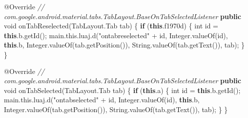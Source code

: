 \documentclass[
]{article}
\newenvironment{Shaded}{}{}
\newcommand{\AttributeTok}[1]{\textcolor[rgb]{0.49,0.56,0.16}{#1}}
\newcommand{\BuiltInTok}[1]{\textcolor[rgb]{0.00,0.50,0.00}{#1}}
\newcommand{\CommentTok}[1]{\textcolor[rgb]{0.38,0.63,0.69}{\textit{#1}}}
\newcommand{\ControlFlowTok}[1]{\textcolor[rgb]{0.00,0.44,0.13}{\textbf{#1}}}
\newcommand{\DataTypeTok}[1]{\textcolor[rgb]{0.56,0.13,0.00}{#1}}
\newcommand{\FunctionTok}[1]{\textcolor[rgb]{0.02,0.16,0.49}{#1}}
\newcommand{\KeywordTok}[1]{\textcolor[rgb]{0.00,0.44,0.13}{\textbf{#1}}}
\newcommand{\NormalTok}[1]{#1}
\newcommand{\OperatorTok}[1]{\textcolor[rgb]{0.40,0.40,0.40}{#1}}
\newcommand{\StringTok}[1]{\textcolor[rgb]{0.25,0.44,0.63}{#1}}
\begin{document}
\begin{Shaded}
\begin{Highlighting}[]
        \AttributeTok{@Override} \CommentTok{// com.google.android.material.tabs.TabLayout.BaseOnTabSelectedListener}
        \KeywordTok{public} \DataTypeTok{void} \FunctionTok{onTabReselected}\OperatorTok{(}\NormalTok{TabLayout}\OperatorTok{.}\FunctionTok{Tab}\NormalTok{ tab}\OperatorTok{)} \OperatorTok{\{}
            \ControlFlowTok{if} \OperatorTok{(}\KeywordTok{this}\OperatorTok{.}\FunctionTok{f1970d}\OperatorTok{)} \OperatorTok{\{}
                \DataTypeTok{int}\NormalTok{ id }\OperatorTok{=} \KeywordTok{this}\OperatorTok{.}\FunctionTok{b}\OperatorTok{.}\FunctionTok{getId}\OperatorTok{();}
\NormalTok{                main}\OperatorTok{.}\FunctionTok{this}\OperatorTok{.}\FunctionTok{luaj}\OperatorTok{.}\FunctionTok{d}\OperatorTok{(}\StringTok{"ontabreselected"} \OperatorTok{+}\NormalTok{ id}\OperatorTok{,} \BuiltInTok{Integer}\OperatorTok{.}\FunctionTok{valueOf}\OperatorTok{(}\NormalTok{id}\OperatorTok{),} \KeywordTok{this}\OperatorTok{.}\FunctionTok{b}\OperatorTok{,} \BuiltInTok{Integer}\OperatorTok{.}\FunctionTok{valueOf}\OperatorTok{(}\NormalTok{tab}\OperatorTok{.}\FunctionTok{getPosition}\OperatorTok{()),} \BuiltInTok{String}\OperatorTok{.}\FunctionTok{valueOf}\OperatorTok{(}\NormalTok{tab}\OperatorTok{.}\FunctionTok{getText}\OperatorTok{()),}\NormalTok{ tab}\OperatorTok{);}
            \OperatorTok{\}}
        \OperatorTok{\}}

        \AttributeTok{@Override} \CommentTok{// com.google.android.material.tabs.TabLayout.BaseOnTabSelectedListener}
        \KeywordTok{public} \DataTypeTok{void} \FunctionTok{onTabSelected}\OperatorTok{(}\NormalTok{TabLayout}\OperatorTok{.}\FunctionTok{Tab}\NormalTok{ tab}\OperatorTok{)} \OperatorTok{\{}
            \ControlFlowTok{if} \OperatorTok{(}\KeywordTok{this}\OperatorTok{.}\FunctionTok{a}\OperatorTok{)} \OperatorTok{\{}
                \DataTypeTok{int}\NormalTok{ id }\OperatorTok{=} \KeywordTok{this}\OperatorTok{.}\FunctionTok{b}\OperatorTok{.}\FunctionTok{getId}\OperatorTok{();}
\NormalTok{                main}\OperatorTok{.}\FunctionTok{this}\OperatorTok{.}\FunctionTok{luaj}\OperatorTok{.}\FunctionTok{d}\OperatorTok{(}\StringTok{"ontabselected"} \OperatorTok{+}\NormalTok{ id}\OperatorTok{,} \BuiltInTok{Integer}\OperatorTok{.}\FunctionTok{valueOf}\OperatorTok{(}\NormalTok{id}\OperatorTok{),} \KeywordTok{this}\OperatorTok{.}\FunctionTok{b}\OperatorTok{,} \BuiltInTok{Integer}\OperatorTok{.}\FunctionTok{valueOf}\OperatorTok{(}\NormalTok{tab}\OperatorTok{.}\FunctionTok{getPosition}\OperatorTok{()),} \BuiltInTok{String}\OperatorTok{.}\FunctionTok{valueOf}\OperatorTok{(}\NormalTok{tab}\OperatorTok{.}\FunctionTok{getText}\OperatorTok{()),}\NormalTok{ tab}\OperatorTok{);}
            \OperatorTok{\}}
        \OperatorTok{\}}


\end{Highlighting}
\end{Shaded}
\end{document}
